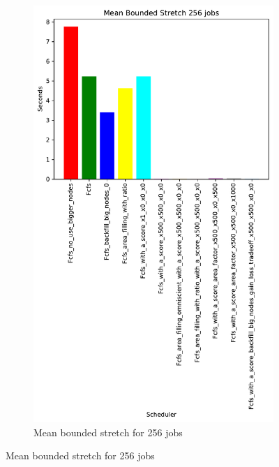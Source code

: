 \documentclass[a4paper]{article}
\begin{document}
\begin{figure}[H]
\begin{subfigure}[b]{0.4\linewidth}\centering\includegraphics[width=0.7\linewidth]{MBSS/plot/Results_Size_And_Data_2022-03-01->2022-03-03_V9271_Mean_Stretch_With_a_Minimum_256_450_128_32_256_4_1024.pdf}\caption{Mean bounded stretch for 256 jobs}\label{45}\end{subfigure}

\end{figure}
\end{document}
